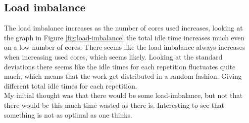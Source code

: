 \documentclass[a4paper,12pt]{article}
\begin{document}
\subsection{Load imbalance}
The load imbalance increases as the number of cores used increases, looking at the graph in Figure \ref{fig:load-imbalance} the total idle time increases much even on a low number of cores. 
There seems like the load imbalance always increases when increasing used cores, which seems likely. Looking at the standard deviations there seems like the idle times for each repetition fluctuates quite much, which means that the work get distributed in a random fashion. 
Giving different total idle times for each repetition. 
\\
My initial thought was that there would be some load-imbalance, but not that there would be this much time wasted as there is. Interesting to see that something is not as optimal as one thinks.
  
\end{document}
